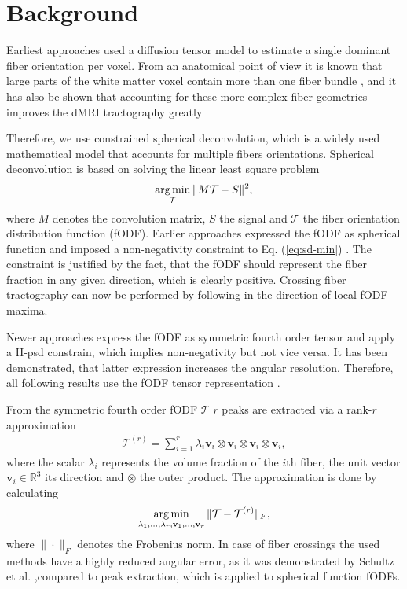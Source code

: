 \section{Background}\label{background}
Earliest approaches used a diffusion tensor model
\cite{LeBihan:1986,Mori:1999} to estimate a single dominant fiber orientation
per voxel. From an anatomical point of view it is known that large parts of the
white matter voxel contain more than one fiber bundle \cite{Jeurissen:2012}, and it has also be shown
that accounting for these more complex fiber geometries improves the dMRI
tractography greatly \cite{Neher:2015}

Therefore, we use constrained spherical deconvolution, which is a widely used
mathematical model that accounts for multiple fibers orientations.
Spherical deconvolution is based on solving the linear least square problem 
\begin{align}
	\operatorname*{arg\,min}_{\mathcal{T}} \| M \mathcal{T} - S \|^2,
	\label{eq:sd-min}
\end{align}
where 
$M$ denotes the convolution matrix, $S$ the signal and $\mathcal{T}$ the fiber
orientation distribution function (fODF).
Earlier approaches expressed the fODF as spherical function and imposed a
non-negativity constraint to Eq. (\ref{eq:sd-min}) \cite{TOURNIER20071459}. The
constraint is justified by
the fact, that the fODF should represent the fiber fraction in any given
direction, which is clearly positive. Crossing fiber tractography can now be
performed by following in the direction of local fODF maxima.

Newer approaches express the fODF as symmetric fourth order tensor and apply a
H-psd constrain, which implies non-negativity but not vice versa. It has been
demonstrated, that latter expression increases the angular resolution.
Therefore, all following results use the fODF tensor representation
\cite{Ankele:CARS2017}. 

From the symmetric fourth order fODF $\mathcal{T}$ $r$ peaks are extracted via a rank-$r$
approximation 
\begin{align}
	\mathcal{T}^{\left( r \right)} = \sum_{i=1}^r \lambda_i \mathbf{v}_i
	\otimes \mathbf{v}_i \otimes \mathbf{v}_i \otimes \mathbf{v}_i, 
	\label{eq:low-rank}
\end{align}
where the scalar $\lambda_i$ represents the volume fraction of the $i$th fiber,
the unit vector $\mathbf{v}_i \in \mathbb{R}^3$ its direction and $\otimes$ the
outer product. The approximation is done by calculating 
\[ \operatorname*{arg\,min}_{\lambda_1, \dots , \lambda_r , \mathbf{v}_1, \dots , \mathbf{v}_r}
\| \mathcal{T} - \mathcal{T}^{\left( r \right)} \|_F, \]
where $\| \cdot \|_F$ denotes the Frobenius norm. In case of fiber crossings the
used methods have a highly reduced angular error, as it was demonstrated by
Schultz et al. \cite{lowrank},compared to peak extraction, which is applied to spherical function fODFs.

